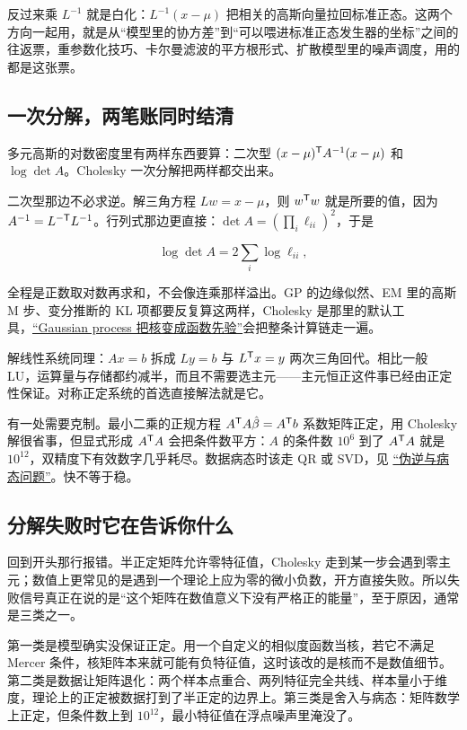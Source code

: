反过来乘 \(L^{-1}\) 就是白化：\(L^{-1}(x-\mu)\) 把相关的高斯向量拉回标准正态。这两个方向一起用，就是从``模型里的协方差''到``可以喂进标准正态发生器的坐标''之间的往返票，重参数化技巧、卡尔曼滤波的平方根形式、扩散模型里的噪声调度，用的都是这张票。

\subsection{一次分解，两笔账同时结清}

多元高斯的对数密度里有两样东西要算：二次型 \((x-\mu)^{\mathsf{T}}A^{-1}(x-\mu)\) 和 \(\log\det A\)。Cholesky 一次分解把两样都交出来。

二次型那边不必求逆。解三角方程 \(Lw=x-\mu\)，则 \(w^{\mathsf{T}}w\) 就是所要的值，因为 \(A^{-1}=L^{-\mathsf{T}}L^{-1}\)。行列式那边更直接：\(\det A=(\prod_i\ell_{ii})^2\)，于是

\[
\log\det A=2\sum_i\log\ell_{ii},
\]

全程是正数取对数再求和，不会像连乘那样溢出。GP 的边缘似然、EM 里的高斯 M 步、变分推断的 KL 项都要反复算这两样，Cholesky 是那里的默认工具，\hyperref[sec:13-Machine-Learning/09-Kernel-Methods-and-Gaussian-Processes/05]{``Gaussian process 把核变成函数先验''}会把整条计算链走一遍。

解线性系统同理：\(Ax=b\) 拆成 \(Ly=b\) 与 \(L^{\mathsf{T}}x=y\) 两次三角回代。相比一般 LU，运算量与存储都约减半，而且不需要选主元——主元恒正这件事已经由正定性保证。对称正定系统的首选直接解法就是它。

有一处需要克制。最小二乘的正规方程 \(A^{\mathsf{T}}A\hat\beta=A^{\mathsf{T}}b\) 系数矩阵正定，用 Cholesky 解很省事，但显式形成 \(A^{\mathsf{T}}A\) 会把条件数平方：\(A\) 的条件数 \(10^{6}\) 到了 \(A^{\mathsf{T}}A\) 就是 \(10^{12}\)，双精度下有效数字几乎耗尽。数据病态时该走 QR 或 SVD，见 \hyperref[sec:03-Linear-Algebra/07-SVD-and-Data-Applications/02]{``伪逆与病态问题''}。快不等于稳。

\subsection{分解失败时它在告诉你什么}

回到开头那行报错。半正定矩阵允许零特征值，Cholesky 走到某一步会遇到零主元；数值上更常见的是遇到一个理论上应为零的微小负数，开方直接失败。所以失败信号真正在说的是``这个矩阵在数值意义下没有严格正的能量''，至于原因，通常是三类之一。

第一类是模型确实没保证正定。用一个自定义的相似度函数当核，若它不满足 Mercer 条件，核矩阵本来就可能有负特征值，这时该改的是核而不是数值细节。第二类是数据让矩阵退化：两个样本点重合、两列特征完全共线、样本量小于维度，理论上的正定被数据打到了半正定的边界上。第三类是舍入与病态：矩阵数学上正定，但条件数上到 \(10^{12}\)，最小特征值在浮点噪声里淹没了。

